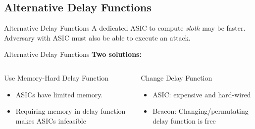 \subsection{Alternative Delay Functions}

\begin{frame}{Alternative Delay Functions}
    \centering
    A dedicated ASIC to compute \emph{sloth} may be faster.
    \\
    \vspace{1cm}
    Adversary with ASIC must also be able to execute an attack.
\end{frame}

\begin{frame}{Alternative Delay Functions}
    \centering
    \textbf{Two solutions:}

    \vspace{.5cm}
    
    \begin{columns}[T, onlytextwidth]
        \begin{block}{Use Memory-Hard Delay Function}
            \begin{itemize}
                \item ASICs have limited memory.
                \item Requiring memory in delay function makes ASICs infeasible
            \end{itemize}
        \end{block}

        \begin{block}{Change Delay Function}
            \begin{itemize}
                \item ASIC: expensive and hard-wired
                \item Beacon: Changing/permutating delay function is free
            \end{itemize}
        \end{block}
    \end{columns}
\end{frame}



